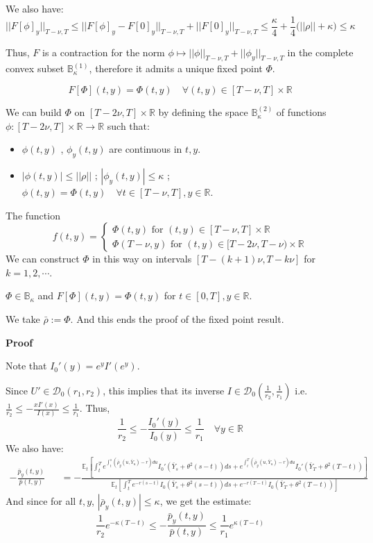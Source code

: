 \documentclass[11pt, psfig]{article}
\theoremstyle{definition}
\theoremstyle{remark}
\numberwithin{equation}{section}
\def\sR{\mathbb{R}}
\def\sR{\mathbb{R}}
\def\sE{\mathbb{E}}
\newcommand{\be}{\begin{equation}}
\newcommand{\ee}{\end{equation}}
\def \proof{{\noindent \bf Proof}\quad}
\begin{document}
We also have:
$$||F[\phi ]_y||_{T-\nu, T} \leq ||F[\phi ]_y-F[0]_y||_{T-\nu, T} +||F[0]_y||_{T-\nu, T} \leq \frac{\kappa}{4}+\frac{1}{4}
\big(||\rho|| + \kappa \big)\leq \kappa
$$



Thus, $F$ is a contraction for the norm $\phi \mapsto || \phi ||_{T-\nu, T}+||\phi_y||_{T-\nu,T}$ in the complete convex subset $\mathbb{B}_{\kappa}^{(1)}$,  therefore it admits a unique fixed point $\Phi$.

\be
F[\Phi](t,y) =  \Phi(t,y) \quad \forall (t,y)\in [T-\nu, T]\times \sR 
\ee

We can build $\Phi$ on $[T-2\nu, T]\times \sR$ by defining the space
$\mathbb{B}_{\kappa}^{(2)}$ of functions $ \phi:[T-2\nu,T]\times \sR \rightarrow \sR$ such that:
\begin{itemize}
\item $\phi(t,y)$ , $\phi_y(t,y)$ are continuous in $t,y$.
\item $|\phi(t,y)|\leq ||\rho||$ ; $|\phi_y(t,y)|\leq \kappa$ ; $\phi(t,y) = \Phi(t,y)\quad \forall t\in [T-\nu,T], y\in \sR$.
\end{itemize}

The function $$f(t,y) = \begin{cases}
 \Phi(t,y) \textrm{ for } (t,y) \in  [T-\nu, T]\times \sR  \\
  \Phi(T-\nu,y)  \textrm{ for } (t,y) \in [T-2\nu, T-\nu)\times \sR
\end{cases}
$$
We can construct $\Phi$ in this way on intervals $[T-(k+1)\nu, T-k\nu]$ for $k=1,2, \cdots$.

$\Phi \in \mathbb{B}_{\kappa}$ and $F[\Phi](t,y) = \Phi(t,y)$ for $t\in [0,T], y\in \sR$.

We take $\bar{\rho} := \Phi$.  
And this ends the proof of the fixed point result.






\proof{Proof proposition \ref{p_v_D0}}

Note that $I_0'(y)=e^y I'(e^y)$.

Since $U' \in \mathcal{D}_0(r_1, r_2)$, this implies that its inverse $I\in  \mathcal{D}_0\left(\frac{1}{r_2}, \frac{1}{r_1}\right)$ i.e. $\frac{1}{r_2} \leq -\frac{xI'(x)}{I(x)}\leq \frac{1}{r_1}$. 
Thus,
\begin{equation}\label{bound_I0}
 \frac{1}{r_2} \leq -\frac{I_0'(y)}{I_0(y)}\leq \frac{1}{r_1} \quad \forall y\in \sR
\end{equation}
We also have:
\begin{eqnarray*}
-\frac{\bar{p}_y(t,y)}{\bar{p}(t,y)} &&= - \frac{ \sE_t\left[  \int_{t}^T e^{\int_t^s ( \bar{\rho}_y(u, \bar{Y}_u)-r ) du} I_0'(\bar{Y}_s+\theta^2(s-t))ds  + e^{\int_t^T  (\bar{\rho}_y(u, \bar{Y}_u)-r ) du} I_0'(\bar{Y}_T+\theta^2(T-t))\right]}{ \sE_t\left[ \int_{t}^T e^{- r(s-t) }  I_0(\bar{Y}_s+\theta^2(s-t))ds  +e^{- r(T-t) }  I_0(\bar{Y}_T+\theta^2(T-t))  \right]}
\end{eqnarray*}
And since for all $t,y$,  $|\bar{\rho}_y(t,y) | \leq \kappa$, we get the estimate:
\be
 \frac{1}{r_2} e^{-\kappa(T-t)}\leq -\frac{\bar{p}_y(t,y)}{\bar{p}(t,y)} \leq  \frac{1}{r_1}   e^{\kappa(T-t)}
\ee
\end{document}
